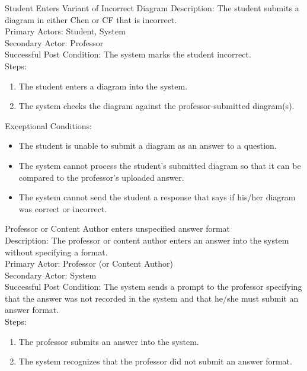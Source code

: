     \begin{section}{Student Enters Variant of Incorrect Diagram}
        Description: The student submits a diagram in either Chen or CF that is incorrect.\\
        Primary Actors: Student, System \\
        Secondary Actor: Professor\\
        Successful Post Condition: The system marks the student incorrect. \\
        Steps:	
        \begin{enumerate}
            \item The student enters a diagram into the system.
            \item The system checks the diagram against the professor-submitted diagram(s).
        \end{enumerate}
        Exceptional Conditions:
        \begin{itemize}
            \item The student is unable to submit a diagram as an answer to a question.
            \item The system cannot process the student's submitted diagram so that it can be compared to the professor's uploaded answer.
            \item The system cannot send the student a response that says if his/her diagram was correct or incorrect.
        \end{itemize}
    \end{section}
    
    \begin{section}{Professor or Content}
        Author enters unspecified answer format\\
        Description: The professor or content author enters an answer into the system without specifying a format.\\
        Primary Actor: Professor (or Content Author)\\
        Secondary Actor: System\\
        Successful Post Condition: The system sends a prompt to the professor specifying that the answer was not recorded in the system and that he/she must submit an answer format. \\
        Steps:	
        \begin{enumerate}
            \item The professor submits an answer into the system.	
            \item The system recognizes that the professor did not submit an answer format.
        \end{enumerate}
    \end{section}
    
